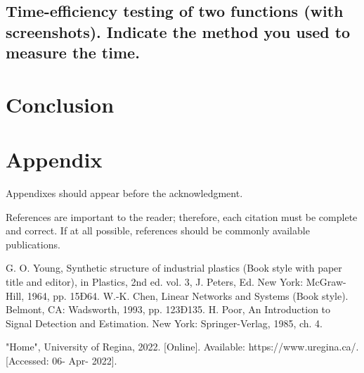 \documentclass[letterpaper, 10 pt, conference]{ieeeconf}
\begin{document}
\subsection{Time-eﬀiciency testing of two functions (with screenshots). Indicate the method you used to measure the time.}

\section{Conclusion}


\addtolength{\textheight}{-12cm}








\section*{Appendix}

Appendixes should appear before the acknowledgment.



References are important to the reader; therefore, each citation must be complete and correct. If at all possible, references should be commonly available publications.



\begin{thebibliography}{99}

 G. O. Young, Synthetic structure of industrial plastics (Book style with paper title and editor), 	in Plastics, 2nd ed. vol. 3, J. Peters, Ed.  New York: McGraw-Hill, 1964, pp. 15Ð64.
 W.-K. Chen, Linear Networks and Systems (Book style).	Belmont, CA: Wadsworth, 1993, pp. 123Ð135.
 H. Poor, An Introduction to Signal Detection and Estimation.   New York: Springer-Verlag, 1985, ch. 4.

 "Home", University of Regina, 2022. [Online]. Available: https://www.uregina.ca/. [Accessed: 06- Apr- 2022].

\end{thebibliography}
\end{document}
